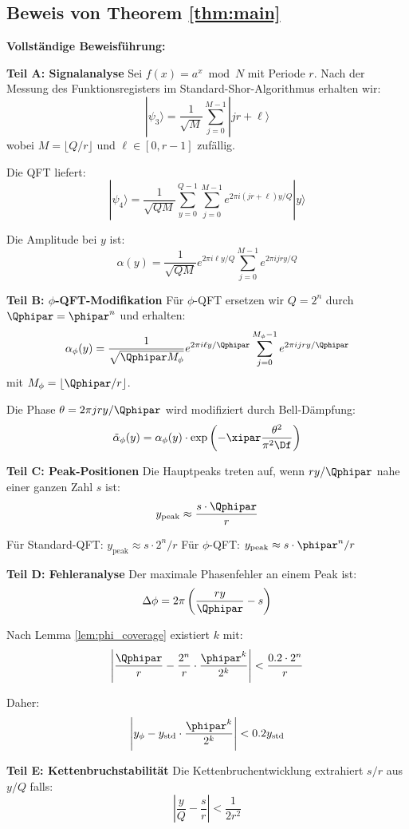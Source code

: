 \subsection{Beweis von Theorem \ref{thm:main}}
\label{app:proof_main}

\textbf{Vollständige Beweisführung:}

\textbf{Teil A: Signalanalyse}
Sei $f(x) = a^x \bmod N$ mit Periode $r$. Nach der Messung des Funktionsregisters im Standard-Shor-Algorithmus erhalten wir:
\[
|\psi_3\rangle = \frac{1}{\sqrt{M}} \sum_{j=0}^{M-1} |jr + \ell\rangle
\]
wobei $M = \lfloor Q/r \rfloor$ und $\ell \in [0, r-1]$ zufällig.

Die QFT liefert:
\[
|\psi_4\rangle = \frac{1}{\sqrt{QM}} \sum_{y=0}^{Q-1} \sum_{j=0}^{M-1} e^{2\pi i (jr + \ell)y/Q} |y\rangle
\]

Die Amplitude bei $y$ ist:
\[
\alpha(y) = \frac{1}{\sqrt{QM}} e^{2\pi i \ell y/Q} \sum_{j=0}^{M-1} e^{2\pi i j r y/Q}
\]

\textbf{Teil B: $\phi$-QFT-Modifikation}
Für $\phi$-QFT ersetzen wir $Q = 2^n$ durch $\Qphipar = \phipar^n$ und erhalten:
\[
\alpha_{\phi}(y) = \frac{1}{\sqrt{\Qphipar M_{\phi}}} e^{2\pi i \ell y/\Qphipar} \sum_{j=0}^{M_{\phi}-1} e^{2\pi i j r y/\Qphipar}
\]
mit $M_{\phi} = \lfloor \Qphipar/r \rfloor$.

Die Phase $\theta = 2\pi j r y/\Qphipar$ wird modifiziert durch Bell-Dämpfung:
\[
\tilde{\alpha}_{\phi}(y) = \alpha_{\phi}(y) \cdot \exp\left(-\xipar \frac{\theta^2}{\pi^2 \Df}\right)
\]

\textbf{Teil C: Peak-Positionen}
Die Hauptpeaks treten auf, wenn $ry/\Qphipar$ nahe einer ganzen Zahl $s$ ist:
\[
y_{\text{peak}} \approx \frac{s \cdot \Qphipar}{r}
\]

Für Standard-QFT: $y_{\text{peak}} \approx s \cdot 2^n / r$
Für $\phi$-QFT: $y_{\text{peak}} \approx s \cdot \phipar^n / r$

\textbf{Teil D: Fehleranalyse}
Der maximale Phasenfehler an einem Peak ist:
\[
\Delta\phi = 2\pi \left( \frac{ry}{\Qphipar} - s \right)
\]

Nach Lemma \ref{lem:phi_coverage} existiert $k$ mit:
\[
\left| \frac{\Qphipar}{r} - \frac{2^n}{r} \cdot \frac{\phipar^k}{2^k} \right| < \frac{0.2 \cdot 2^n}{r}
\]

Daher:
\[
\left| y_{\phi} - y_{\text{std}} \cdot \frac{\phipar^k}{2^k} \right| < 0.2 y_{\text{std}}
\]

\textbf{Teil E: Kettenbruchstabilität}
Die Kettenbruchentwicklung extrahiert $s/r$ aus $y/Q$ falls:
\[
\left| \frac{y}{Q} - \frac{s}{r} \right| < \frac{1}{2r^2}
\]

